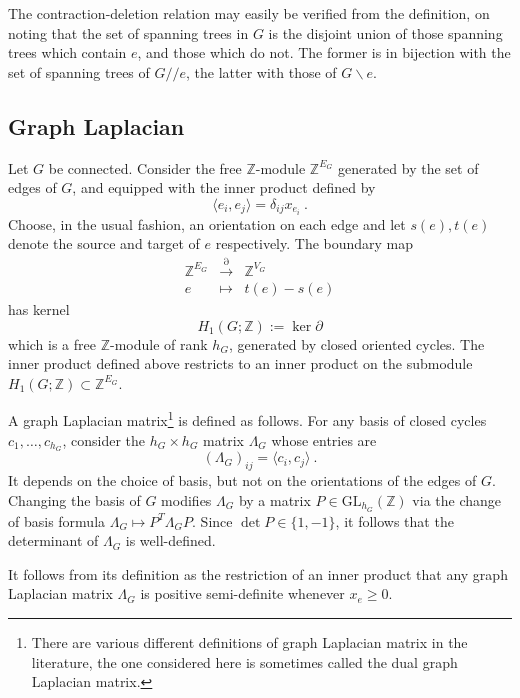 \documentclass[12pt]{amsart}
\newcommand{\ZZ}{{\mathbb Z}}
\theoremstyle{plain}
\newcommand{\GL}{\mathrm{GL}}
\newcommand{\To}{\longrightarrow}
\newcommand{\q}{/\!\!/}
\newcommand{\0}{\color{blue}{\mathsf{0}}}
\begin{document}
 The contraction-deletion relation may easily be verified from the definition, on noting that the set of spanning trees in $G$ is the disjoint union of those spanning trees which contain $e$, and those which do not. The former is in bijection with the set of spanning trees of $G\q e$, the latter with those of $G \backslash  e$.

\subsection{Graph Laplacian} Let $G$ be connected. Consider the free $\ZZ$-module $\ZZ^{E_G}$ generated by the set of edges of $G$, and equipped with the inner product defined by 
\[  \langle e_i, e_j \rangle = \delta_{ij} x_{e_i} \ . \]
Choose, in the usual fashion, an orientation on each edge and let $s(e), t(e)$ denote the source and target of $e$ respectively. The boundary map
\begin{eqnarray} \ZZ^{E_G} &  \overset{\partial}{\To} &  \ZZ^{V_G}  \nonumber  \\
e & \mapsto & t(e) - s(e) \nonumber 
\end{eqnarray} 
has kernel 
\[ H_1(G;\ZZ) := \ker \partial\]
which is a free $\ZZ$-module of rank $h_G$, generated by closed oriented cycles. 
The inner product defined above restricts to an inner product on the submodule  $H_1(G;\ZZ) \subset \ZZ^{E_G}$.

A graph Laplacian matrix\footnote{There are various different definitions of graph Laplacian matrix in the literature, the one considered here is sometimes called the dual graph Laplacian matrix.} is defined as follows.    For any basis of closed cycles $c_1,\ldots, c_{h_G}$, consider the $h_G \times h_G$ matrix $\Lambda_G$ whose entries are 
\[ (\Lambda_G)_{ij} =  \langle c_i, c_j \rangle\ . \]  
It  depends on the choice of basis, but not on the orientations of the edges of $G$. Changing the basis of $G$ modifies $\Lambda_G$ by a matrix $P \in \GL_{h_G}(\ZZ)$ via the change of basis formula $\Lambda_G \mapsto P^T \Lambda_G P$. Since $\det P \in \{1, -1\}$, it follows that the determinant of $\Lambda_G$ is well-defined. 

It follows from its definition as the restriction of an inner product that any graph Laplacian matrix $\Lambda_G$ is positive semi-definite whenever $x_e \geq 0$. 
\end{document}
